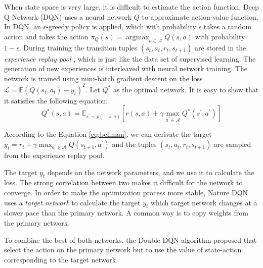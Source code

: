 \documentclass[journal]{IEEEtran}
\begin{document}
When state space is very large, it is difficult to estimate the action function, Deep Q Network (DQN) \cite{mnih2015human} uses a neural network $Q$ to approximate action-value function.
In DQN, an $\epsilon$-greedy policy is applied, which with probability $\epsilon$ takes a random action and takes the action $\pi_{Q}(s)=\operatorname{argmax}_{a \in \mathcal{A}} Q(s, a)$ with probability $1-\epsilon$.
During training the transition tuples $(s_{t}, a_{t}, r_{t}, s_{t+1})$ are stored in the \textit{experience replay pool} \cite{her}, which is just like the data set of supervised learning. The generation of new experiences is interleaved with neural network training. The network is trained using mini-batch gradient descent on the loss $\mathcal{L}=\mathbb{E}\left(Q\left(s_{t}, a_{t}\right)-y_{t}\right)^{2}$.
Let $Q^*$ as the optimal network, It is easy to show that it satisfies the following equation:
\begin{equation}
    Q^{*}(s, a)=\mathbb{E}_{s^{\prime} \sim p(\cdot \mid s, a)}\left[r(s, a)+\gamma \max _{a^{\prime} \in \mathcal{A}} Q^{*}\left(s^{\prime}, a^{\prime}\right)\right]
    \label{eq:bellman}
\end{equation}

According to the Equation \ref{eq:bellman}, we can derivate the target $y_{t}=r_{t}+\gamma \max _{a^{\prime} \in \mathcal{A}} Q\left(s_{t+1}, a^{\prime}\right)$ and the tuples $(s_{t}, a_{t}, r_{t}, s_{t+1})$ are sampled from the experience replay pool.


The target $y_t$ depends on the network parameters, and we use it to calculate the loss. The strong correlation between two makes it difficult for the network to converge. In order to make the optimization process more stable, Nature DQN \cite{mnih2015human} uses a \textit{target network} to calculate the target $y_t$ which target network changes at a slower pace than the primary network. A common way is to copy weights from the primary network.

To combine the best of both networks, the Double DQN \cite{ddqn} algorithm proposed that select the action on the primary network but to use the value of state-action corresponding to the target network.
\end{document}
